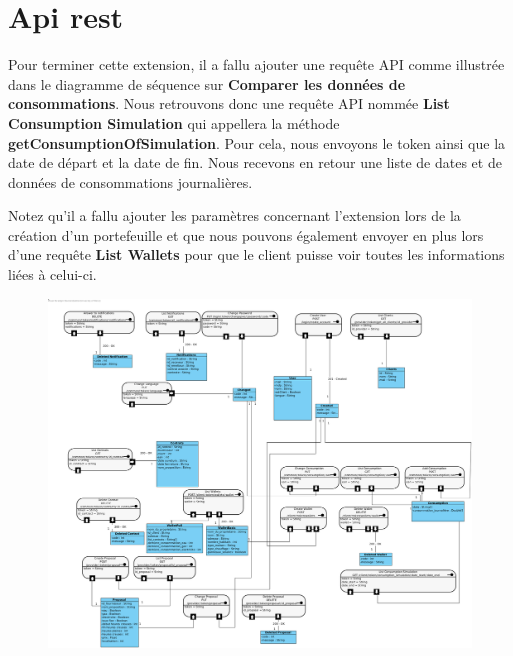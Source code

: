 \section{Api rest}

\begin{flushleft}
Pour terminer cette extension, il a fallu ajouter une requête API comme illustrée dans le diagramme de séquence sur \textbf{Comparer les données de consommations}. Nous retrouvons donc une requête API nommée \textbf{List Consumption Simulation} qui appellera la méthode \textbf{getConsumptionOfSimulation}. Pour cela, nous envoyons le token ainsi que la date de départ et la date de fin. Nous recevons en retour une liste de dates et de données de consommations journalières.
\end{flushleft}

\begin{flushleft}
Notez qu'il a fallu ajouter les paramètres concernant l'extension lors de la création d'un portefeuille et que nous pouvons également envoyer en plus lors d'une requête \textbf{List Wallets} pour que le client puisse voir toutes les informations liées à celui-ci.
\end{flushleft}

\begin{figure}[h]
\centering
\includegraphics[width=1.3\textwidth]{extension-adrien/Api-rest/img/apirest.png}
\end{figure}
